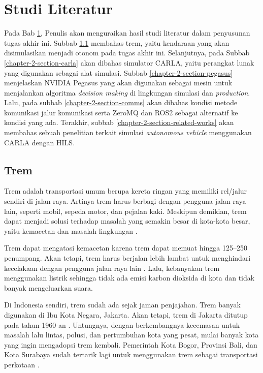 \chapter{Studi Literatur}\label{chapter-2}

Pada Bab \ref{chapter-2}, Penulis akan menguraikan hasil studi literatur dalam
penyusunan tugas akhir ini. Subbab \ref{chapter-2-section-trem} membahas trem,
yaitu kendaraan yang akan disimulasikan menjadi otonom pada tugas akhir ini.
Selanjutnya, pada Subbab \ref{chapter-2-section-carla} akan dibahas simulator
CARLA, yaitu perangkat lunak yang digunakan sebagai alat simulasi.  Subbab
\ref{chapter-2-section-pegasus} menjelaskan NVIDIA Pegasus yang akan digunakan
sebagai mesin untuk menjalankan algoritma \textit{decision making} di lingkungan
simulasi dan \textit{production}. Lalu, pada subbab
\ref{chapter-2-section-comms} akan dibahas kondisi metode komunikasi jalur
komunikasi serta ZeroMQ dan ROS2 sebagai alternatif ke kondisi yang ada.
Terakhir, subbab \ref{chapter-2-section-related-works} akan membahas sebuah
penelitian terkait simulasi \textit{autonomous vehicle} menggunakan CARLA dengan
HILS.

\section{Trem}\label{chapter-2-section-trem}

Trem adalah transportasi umum berupa kereta ringan yang memiliki rel/jalur
sendiri di jalan raya. Artinya trem harus berbagi dengan pengguna jalan raya
lain, seperti mobil, sepeda motor, dan pejalan kaki. Meskipun demikian, trem
dapat menjadi solusi terhadap masalah yang semakin besar di kota-kota besar,
yaitu kemacetan dan masalah lingkungan \parencite{trilaksono_laporanRispro}.

Trem dapat mengatasi kemacetan karena trem dapat memuat hingga 125--250
penumpang.  Akan tetapi, trem harus berjalan lebih lambat untuk menghindari
kecelakaan dengan pengguna jalan raya lain \parencite{trilaksono_laporanRispro}.
Lalu, kebanyakan trem menggunakan listrik sehingga tidak ada emisi karbon
dioksida di kota dan tidak banyak mengeluarkan suara.

Di Indonesia sendiri, trem sudah ada sejak jaman penjajahan. Trem banyak
digunakan di Ibu Kota Negara, Jakarta. Akan tetapi, trem di Jakarta ditutup pada
tahun 1960-an \parencite{adryamarthanino_sejarahTremDiJakarta}. Untungnya,
dengan berkembangnya kecemasan untuk masalah lalu lintas, polusi, dan
pertumbuhan kota yang pesat, mulai banyak kota yang ingin mengadopsi trem
kembali. Pemerintah Kota Bogor, Provinsi Bali, dan Kota Surabaya sudah tertarik
lagi untuk menggunakan trem sebagai transportasi perkotaan
\parencite{trilaksono_laporanRispro}.

